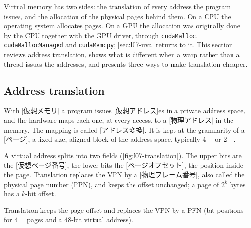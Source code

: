 \documentclass[../main.tex]{subfiles}
\begin{document}
Virtual memory has two sides: the translation of every address the
program issues, and the allocation of the physical pages behind
them.  On a CPU the operating
system allocates pages.  On a GPU the allocation was originally done by
the CPU together with the GPU driver, through \texttt{cudaMalloc},
\texttt{cudaMallocManaged} and \texttt{cudaMemcpy}; \cref{sec:l07-uva}
returns to it.  This section reviews address translation, shows what
is different when a warp rather than a thread issues the addresses, and
presents three ways to make translation cheaper.

\subsection{Address translation}

\begin{definition}
  \label{def:l07-vm}
  With [仮想メモリ] a program issues
  [仮想アドレス]es in a private address space,
  and the hardware maps each one, at every access, to a
  [物理アドレス] in the memory.  The mapping is
  called [アドレス変換].  It is kept at the
  granularity of a [ページ], a fixed-size, aligned block of
  the address space, typically \SI{4}{\kibi\byte} or
  \SI{2}{\mebi\byte}.
\end{definition}

A virtual address splits into two fields (\cref{fig:l07-translation}).
The upper bits are the
[仮想ページ番号], the lower bits the
[ページオフセット], the position inside the page.
Translation replaces the VPN by a
[物理フレーム番号], also called the
physical page number (PPN), and keeps the offset unchanged; a page of
$2^k$ bytes has a $k$-bit offset.

\begin{marginfigure}
  
  \caption{Translation keeps the page offset and replaces the VPN by a
    PFN (bit positions for \SI{4}{\kibi\byte} pages and a 48-bit
    virtual address).}
  \label{fig:l07-translation}
\end{marginfigure}
\end{document}
